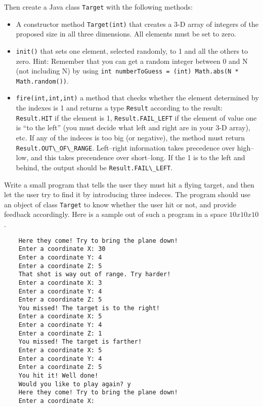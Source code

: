 \documentclass{article}
\begin{document}
Then create a Java class \verb+Target+ with the following methods: 

\begin{itemize}
\item A constructor method \verb+Target(int)+ that creates a 3-D array 
  of integers of the
  proposed size in all three dimensions. All elements must be set to
  zero.
\item \verb+init()+ that sets one element, selected randomly, to 1 and
  all the others to zero. Hint: Remember that you can get a random
  integer between 0 and N (not including N) by
  using \verb+int numberToGuess = (int) Math.abs(N * Math.random())+.
\item \verb+fire(int,int,int)+ a method that checks whether the
  element determined by the indexes is 1 and returns a type
  \verb+Result+ according to the result: \verb+Result.HIT+ if the
  element is 1, \verb+Result.FAIL_LEFT+ if the element of value one is
  ``to the left'' (you must decide what left and right are in your 3-D
  array), etc. If any of the indeces is too big (or negative), the
  method must return \verb+Result.OUT\_OF\_RANGE+. Left--right
  information takes precedence over high--low, and this takes
  precendence over short--long. If the 1 is to the left and behind,
  the output should be \verb+Result.FAIL\_LEFT+.
\end{itemize}

Write a small program that tells the user they must hit a flying
target, and then let the user try to find it by introducing three
indeces. The program should use an object of class \verb+Target+ to
know whether the user hit or not, and provide feedback
accordingly. Here is a sample out of such a program in a space $10 x
10 x 10$. 

\begin{verbatim}
    Here they come! Try to bring the plane down!
    Enter a coordinate X: 30
    Enter a coordinate Y: 4
    Enter a coordinate Z: 5
    That shot is way out of range. Try harder!
    Enter a coordinate X: 3
    Enter a coordinate Y: 4
    Enter a coordinate Z: 5
    You missed! The target is to the right!
    Enter a coordinate X: 5
    Enter a coordinate Y: 4
    Enter a coordinate Z: 1
    You missed! The target is farther!
    Enter a coordinate X: 5
    Enter a coordinate Y: 4
    Enter a coordinate Z: 5
    You hit it! Well done!
    Would you like to play again? y
    Here they come! Try to bring the plane down!
    Enter a coordinate X: 
\end{verbatim}
\end{document}
